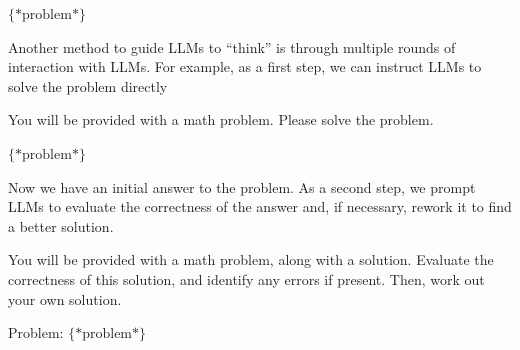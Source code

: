 \begin{itemize}
\begin{tcolorbox}
    \vspace{0.5em}

    $\{*\mathrm{problem}*\}$

    \vspace{0.5em}

    \underline{\hspace{2em}}

    \endgroup

    \end{tcolorbox}
    \vspace{0.5em}

    Another method to guide LLMs to ``think'' is through multiple rounds of interaction with LLMs. For example, as a first step, we can instruct LLMs to solve the problem directly

    \vspace{0.5em}
    \begin{tcolorbox}

    \begingroup
    \setlength{\leftskip}{2em}
    \setlength{\rightskip}{2em}

    You will be provided with a math problem. Please solve the problem.

    \vspace{0.3em}

    $\{*\mathrm{problem}*\}$

    \underline{\hspace{2em}}

    \endgroup

    \end{tcolorbox}
    \vspace{0.5em}

    Now we have an initial answer to the problem. As a second step, we prompt LLMs to evaluate the correctness of the answer and, if necessary, rework it to find a better solution.

    \vspace{0.5em}
    \begin{tcolorbox}

    \begingroup
    \setlength{\leftskip}{2em}
    \setlength{\rightskip}{2em}

    You will be provided with a math problem, along with a solution. Evaluate the correctness of this solution, and identify any errors if present. Then, work out your own solution.

    \vspace{0.3em}

    Problem: $\{*\mathrm{problem}*\}$


\end{tcolorbox}
\end{itemize}
